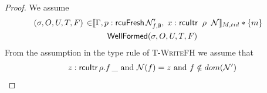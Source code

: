  \begin{proof}
 We assume
\begin{gather}\label{ahu1wf}
  \begin{aligned}
    (\sigma, O, U, T,F) \, \in &  \llbracket \Gamma, p:\textsf{rcuFresh}\,\mathcal{N}'_{f,\emptyset},\; x:\textsf{rcuItr}\;\; \rho \;\; \mathcal{N} \rrbracket_{M,tid} * \{m\}
    \end{aligned} \\
\textsf{WellFormed}(\sigma,O,U,T,F)
\label{ahu2wf}
\end{gather}
From the assumption in the type rule of \textsc{T-WriteFH} we assume that
\begin{gather}
z:\textsf{rcuItr}\,\rho.f\,\_ \text{ and } \mathcal{N}(f) = z \text{ and } f \notin dom(\mathcal{N}')
\label{ahu4wf} 
\end{gather}


\end{proof}
